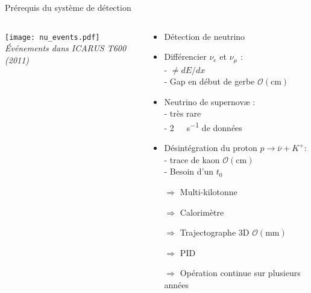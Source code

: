     \begin{frame}{Prérequis du système de détection}
        \begin{scriptsize}
            \begin{columns}
                \begin{column}{0.5\textwidth}
                    \texttt{[image: nu\_events.pdf]}\\\textit{Événements dans ICARUS T600 (2011)}
                \end{column}
                 \begin{column}{0.5\textwidth}
                    \begin{itemize}
                        \item Détection de neutrino
                        \item Différencier $\nu_e$ et $\nu_{\mu}$ : \\ - $\neq dE/dx$ \\ - Gap en début de gerbe $\mathcal{O}(\si{\centi\meter})$
                        \item Neutrino de supernovæ : \\ - très rare \\ - \SI{2}{\tera\byte\per\second} de données
                        \item Désintégration du proton $p\to \overline{\nu} + K^+$: \\ - trace de kaon $\mathcal{O}(\si{\centi\meter})$ \\ - Besoin d'un $t_0$
                    \end{itemize}
                    \begin{itemize}
                        \item[$\Rightarrow$] Multi-kilotonne
                        \item[$\Rightarrow$] Calorimètre
                        \item[$\Rightarrow$] Trajectographe 3D $\mathcal{O}(\si{\milli\meter})$
                        \item[$\Rightarrow$] PID
                        \item[$\Rightarrow$] Opération continue sur plusieurs années
                    \end{itemize}
                \end{column}
            \end{columns}
        \end{scriptsize}
    \end{frame}
                    

